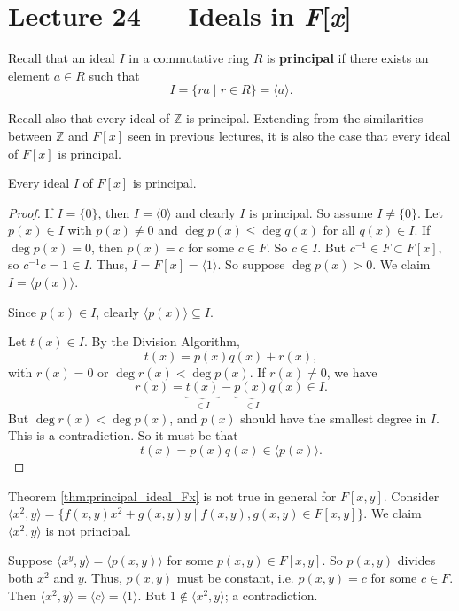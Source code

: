 \section{Lecture 24 — Ideals in \textit{F}[\textit{x}]}

Recall that an ideal $I$ in a commutative ring $R$ is \textbf{principal} if there exists an element $a\in R$ such that
$$I=\{ra\mid r\in R\}=\langle a\rangle.$$

Recall also that every ideal of $\mathbb Z$ is principal. Extending from the similarities between $\mathbb Z$ and $F[x]$ seen in previous lectures, it is also the case that every ideal of $F[x]$ is principal.

\begin{theorem}\label{thm:principal_ideal_Fx}
	Every ideal $I$ of $F[x]$ is principal.
\end{theorem}

\begin{proof}
	If $I=\{0\}$, then $I=\langle 0\rangle$ and clearly $I$ is principal. So assume $I\neq\{0\}$. Let $p(x)\in I$ with $p(x)\neq 0$ and $\deg p(x)\leq\deg q(x)$ for all $q(x)\in I$. If $\deg p(x)=0$, then $p(x)=c$ for some $c\in F$. So $c\in I$. But $c^{-1}\in F\subset F[x]$, so $c^{-1}c=1\in I$. Thus, $I=F[x]=\langle 1\rangle$. So suppose $\deg p(x)>0$. We claim $I=\langle p(x)\rangle$.

	Since $p(x)\in I$, clearly $\langle p(x)\rangle\subseteq I$.

	Let $t(x)\in I$. By the Division Algorithm,
	$$t(x)=p(x)q(x)+r(x),$$
	with $r(x)=0$ or $\deg r(x)<\deg p(x)$. If $r(x)\neq 0$, we have
	$$r(x)=\underbrace{t(x)}_{\in I}-\underbrace{p(x)}_{\in I}q(x)\in I.$$
	But $\deg r(x)<\deg p(x)$, and $p(x)$ should have the smallest degree in $I$. This is a contradiction. So it must be that
	$$t(x)=p(x)q(x)\in\langle p(x)\rangle.$$
\end{proof}

\begin{example}
	Theorem \ref{thm:principal_ideal_Fx} is not true in general for $F[x,y]$. Consider $\langle x^2,y\rangle=\{f(x,y)x^2+g(x,y)y\mid f(x,y),g(x,y)\in F[x,y]\}$. We claim $\langle x^2,y\rangle$ is not principal.

	Suppose $\langle x^y,y\rangle=\langle p(x,y)\rangle$ for some $p(x,y)\in F[x,y]$. So $p(x,y)$ divides both $x^2$ and $y$. Thus, $p(x,y)$ must be constant, i.e. $p(x,y)=c$ for some $c\in F$. Then $\langle x^2,y\rangle=\langle c\rangle=\langle 1\rangle$. But $1\not\in\langle x^2,y\rangle$; a contradiction.
\end{example}

